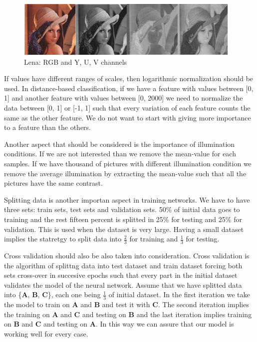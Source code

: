 \begin{figure}[h]
	\begin{center}
		\includegraphics[width=410px,height=102px]{src/img/state/lenayuv}
		\caption{Lena: RGB and Y, U, V channels} \label{fig:lenayuv}
    \end{center}
\end{figure}

If values have different ranges of scales, then logarithmic normalization should be used. In distance-based classification, if we have a feature with values between [0, 1] and another feature with values between [0, 2000] we need to normalize the data between [0, 1] or [-1, 1] such that every variation of each feature counts the same as the other feature. We do not want to start with giving more importance to a feature than the others.

Another aspect that should be considered is the importance of illumination conditions. If we are not interested than we remove the mean-value for each samples. If we have thousand of pictures with different illumination condition we remove the average illumination by extracting the mean-value such that all the pictures have the same contrast.

Splitting data is another importan aspect in training networks. We have to have three sets: train sets, test sets and validation sets. 50\% of initial data goes to training and the rest fifteen percent is splitted in 25\% for testing and 25\% for validation. This is used when the dataset is very large. Having a small dataset implies the statretgy to split data into $\frac{2}{3}$ for training and $\frac{1}{3}$ for testing\cite{splitting}.


Cross validation\cite{cross-validation} should also be also taken into consideration. Cross validation is the algorithm of splittng data into test dataset and train dataset forcing both sets cross-over in succesive epochs such that every part in the initial dataset validates the model of the neural network. Assume that we have splitted data into \{\textbf{A}, \textbf{B}, \textbf{C}\}, each one being $\frac{1}{3}$ of initial dataset. In the first iteration we take the model to train on \textbf{A} and \textbf{B} and test it with \textbf{C}. The second iteration implies the training on \textbf{A} and \textbf{C} and testing on \textbf{B} and the last iteration implies training on \textbf{B} and \textbf{C} and testing on \textbf{A}. In this way we can assure that our model is working well for every case.



